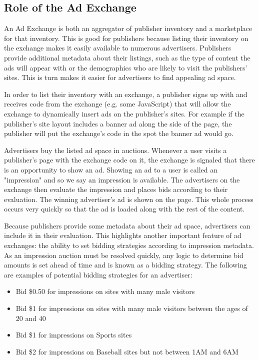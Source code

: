 \documentclass{article}
\begin{document}
\subsection{Role of the Ad Exchange}

An Ad Exchange is both an aggregator of publisher inventory and a marketplace for that inventory. This is good for publishers because listing their inventory on the exchange makes it easily available to numerous advertisers. Publishers provide additional metadata about their listings, such as the type of content the ads will appear with or the demographics who are likely to visit the publishers' sites. This is turn makes it easier for advertisers to find appealing ad space.

In order to list their inventory with an exchange, a publisher signs up with and receives code from the exchange (e.g. some JavaScript) that will allow the exchange to dynamically insert ads on the publisher's sites. For example if the publisher's site layout includes a banner ad along the side of the page, the publisher will put the exchange's code in the spot the banner ad would go.

Advertisers buy the listed ad space in auctions. Whenever a user visits a publisher's page with the exchange code on it, the exchange is signaled that there is an opportunity to show an ad. Showing an ad to a user is called an "impression" and so we say an impression is available. The advertisers on the exchange then evaluate the impression and places bids according to their evaluation. The winning advertiser's ad is shown on the page. This whole process occurs very quickly so that the ad is loaded along with the rest of the content.

Because publishers provide some metadata about their ad space, advertisers can include it in their evaluation. This highlights another important feature of ad exchanges: the ability to set bidding strategies according to impression metadata. As an impression auction must be resolved quickly, any logic to determine bid amounts is set ahead of time and is known as a bidding strategy. The following are examples of potential bidding strategies for an advertiser:

\begin{itemize}
\item Bid \$0.50 for impressions on sites with many male visitors
\item Bid \$1 for impressions on sites with many male visitors between the ages of 20 and 40
\item Bid \$1 for impressions on Sports sites
\item Bid \$2 for impressions on Baseball sites but not between 1AM and 6AM
\end{itemize}
\end{document}
